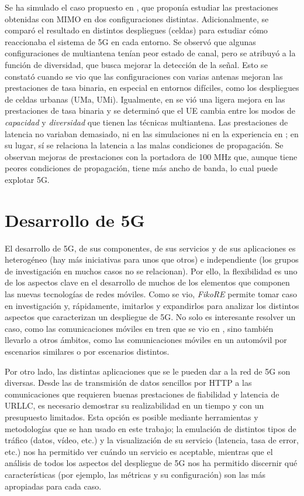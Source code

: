 \documentclass[12pt]{report} %
\begin{document}
Se ha simulado el caso propuesto en \cite{RefWorks:49}, que proponía estudiar las prestaciones obtenidas con MIMO en dos configuraciones distintas.
Adicionalmente, se comparó el resultado en distintos despliegues (celdas) para estudiar cómo reaccionaba el sistema de 5G en cada entorno.
Se observó que algunas configuraciones de multiantena tenían peor estado de canal, pero se atribuyó a la función de diversidad, que busca mejorar la detección de la señal.
Esto se constató cuando se vio que las configuraciones con varias antenas mejoran las prestaciones de tasa binaria, en especial en entornos difíciles, como los despliegues de celdas urbanas (UMa, UMi).
Igualmente, en \cite{RefWorks:49} se vió una ligera mejora en las prestaciones de tasa binaria y se determinó que el UE cambia entre los modos de \textit{capacidad} y \textit{diversidad} que tienen las técnicas multiantena.
Las prestaciones de latencia no variaban demasiado, ni en las simulaciones ni en la experiencia en \cite{RefWorks:49};
en su lugar, sí se relaciona la latencia a las malas condiciones de propagación.
Se observan mejoras de prestaciones con la portadora de 100 MHz que, aunque tiene peores condiciones de propagación, tiene más ancho de banda, lo cual puede explotar 5G.

\section{Desarrollo de 5G}

El desarrollo de 5G, de sus componentes, de sus servicios y de sus aplicaciones es heterogéneo (hay más iniciativas para unos que otros) e independiente (los grupos de investigación en muchos casos no se relacionan).
Por ello, la flexibilidad es uno de los aspectos clave en el desarrollo de muchos de los elementos que componen las nuevas tecnologías de redes móviles.
Como se vio, \textit{FikoRE} permite tomar caso en investigación y, rápidamente, imitarlos y expandirlos para analizar los distintos aspectos que caracterizan un despliegue de 5G.
No solo es interesante resolver un caso, como las comunicaciones móviles en tren que se vio en \cite{RefWorks:49},
sino también llevarlo a otros ámbitos, como las comunicaciones móviles en un automóvil por escenarios similares o por escenarios distintos.

Por otro lado, las distintas aplicaciones que se le pueden dar a la red de 5G son diversas.
Desde las de transmisión de datos sencillos por HTTP a las comunicaciones que requieren buenas prestaciones de fiabilidad y latencia de URLLC,
es necesario demostrar su realizabilidad en un tiempo y con un presupuesto limitados.
Esta opción es posible mediante herramientas y metodologías que se han usado en este trabajo;
la emulación de distintos tipos de tráfico (datos, vídeo, etc.) y la visualización de su servicio (latencia, tasa de error, etc.) nos ha permitido ver cuándo un servicio es aceptable,
mientras que el análisis de todos los aspectos del despliegue de 5G nos ha permitido discernir qué características (por ejemplo, las métricas y su configuración) son las más apropiadas para cada caso.
\end{document}
